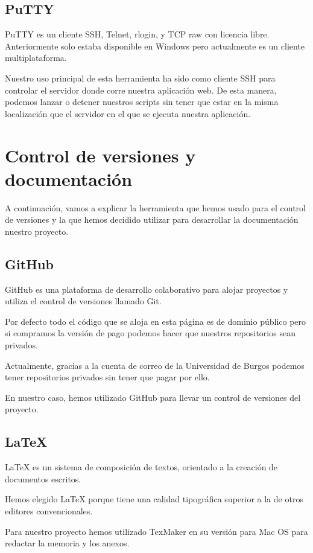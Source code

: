 \subsection{PuTTY}

PuTTY \cite{wiki:putty} es un cliente SSH, Telnet, rlogin, y TCP raw con licencia libre. Anteriormente solo estaba disponible en Windows pero actualmente es un cliente multiplataforma.

Nuestro uso principal de esta herramienta ha sido como cliente SSH para controlar el servidor donde corre nuestra aplicación web. De esta manera, podemos lanzar o detener nuestros scripts sin tener que estar en la misma localización que el servidor en el que se ejecuta nuestra aplicación.

\section{Control de versiones y documentación}

A continuación, vamos a explicar la herramienta que hemos usado para el control de versiones y la que hemos decidido utilizar para desarrollar la documentación nuestro proyecto.

\subsection{GitHub}

GitHub \cite{wiki:github} es una plataforma de desarrollo colaborativo para alojar proyectos y utiliza el control de versiones llamado Git.

Por defecto todo el código que se aloja en esta página es de dominio público pero si compramos la versión de pago podemos hacer que nuestros repositorios sean privados. 

Actualmente, gracias a la cuenta de correo de la Universidad de Burgos podemos tener repositorios privados sin tener que pagar por ello.

En nuestro caso, hemos utilizado GitHub para llevar un control de versiones del proyecto.

\subsection{LaTeX}

LaTeX \cite{wiki:latex} es un sistema de composición de textos, orientado a la creación de documentos escritos.

Hemos elegido LaTeX porque tiene una calidad tipográfica superior a la de otros editores convencionales. 

Para nuestro proyecto hemos utilizado TexMaker en su versión para Mac OS para redactar la memoria y los anexos.





